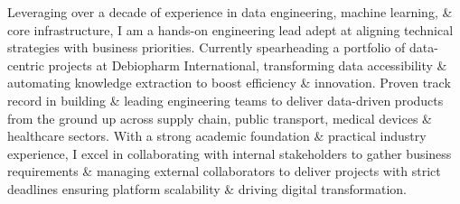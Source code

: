 

\begin{cvparagraph}

Leveraging over a decade of experience in data engineering, machine learning, \& core infrastructure, I am a hands-on engineering lead adept at aligning technical strategies with business priorities. 
Currently spearheading a portfolio of data-centric projects at Debiopharm International, transforming data accessibility \& automating knowledge extraction to boost efficiency \& innovation. 
Proven track record in building \& leading engineering teams to deliver data-driven products from the ground up across supply chain, public transport, medical devices \& healthcare sectors.
With a strong academic foundation \& practical industry experience, I excel in collaborating with internal stakeholders to gather business requirements \& managing external collaborators to deliver projects with strict deadlines ensuring platform scalability \& driving digital transformation.
\end{cvparagraph}

\vspace{-0.5cm}
